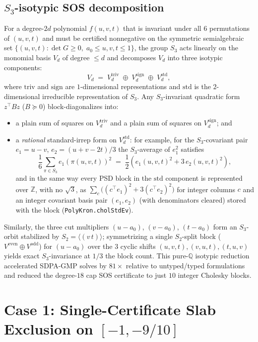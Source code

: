 \documentclass[11pt,reqno]{amsart}
\renewcommand{\_}{\origunderscore\allowbreak}
\theoremstyle{definition}
\newcommand{\Q}{\mathbb{Q}}
\newcommand{\Z}{\mathbb{Z}}
\begin{document}
\subsection{$S_3$-isotypic SOS decomposition}\label{subsec:s3-sos}
For a degree-$2d$ polynomial $f(u,v,t)$ that is invariant under all $6$ permutations of $(u,v,t)$ and must be certified nonnegative on the symmetric semialgebraic set $\{(u,v,t) : \det G \ge 0,\; a_0 \le u,v,t \le 1\}$, the group $S_3$ acts linearly on the monomial basis $V_d$ of degree $\le d$ and decomposes $V_d$ into three isotypic components:
\[
  V_d \;=\; V_d^{\mathrm{triv}} \;\oplus\; V_d^{\mathrm{sign}} \;\oplus\; V_d^{\mathrm{std}},
\]
where $\mathrm{triv}$ and $\mathrm{sign}$ are $1$-dimensional representations and $\mathrm{std}$ is the $2$-dimensional irreducible representation of $S_3$.
Any $S_3$-invariant quadratic form $z^\top B z$ ($B \succeq 0$) block-diagonalizes into:
\begin{itemize}[leftmargin=2em]
  \item a plain sum of squares on $V_d^{\mathrm{triv}}$ and a plain sum of squares on $V_d^{\mathrm{sign}}$; and
  \item a \emph{rational} standard-irrep form on $V_d^{\mathrm{std}}$: for example, for the $S_3$-covariant pair $e_1 = u - v$, $e_2 = (u+v-2t)/3$ the $S_3$-average of $e_1^2$ satisfies
  \begin{equation}\label{eq:std-irrep}
    \frac{1}{6}\sum_{\pi \in S_3} e_1(\pi(u,v,t))^2 \;=\; \frac{1}{2}\left(e_1(u,v,t)^2 + 3\,e_2(u,v,t)^2\right),
  \end{equation}
  and in the same way every PSD block in the $\mathrm{std}$ component is represented over $\Z$, with no $\sqrt{3}$, as $\sum_c \bigl((c^\top e_1)^2 + 3(c^\top e_2)^2\bigr)$ for integer columns $c$ and an integer covariant basis pair $(e_1, e_2)$ (with denominators cleared) stored with the block (\texttt{PolyKron.cholStdEv}).
\end{itemize}
Similarly, the three cut multipliers $(u-a_0)$, $(v-a_0)$, $(t-a_0)$ form an $S_3$-orbit stabilized by $S_2 = \langle(v\,t)\rangle$; symmetrizing a single $S_2$-split block ($V^{\mathrm{even}} \oplus V^{\mathrm{odd}}$) for $(u-a_0)$ over the $3$ cyclic shifts $(u,v,t), (v,u,t), (t,u,v)$ yields exact $S_3$-invariance at $1/3$ the block count.
This pure-$\Q$ isotypic reduction accelerated SDPA-GMP solves by $81\times$ relative to untyped/typed formulations and reduced the degree-$18$ cap SOS certificate to just $10$ integer Cholesky blocks.

\section{Case 1: Single-Certificate Slab Exclusion on $[-1, -9/10]$}\label{sec:slab}
\end{document}
